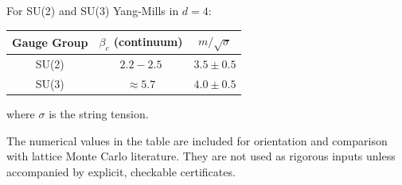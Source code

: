 \begin{theorem}\label{thm:quantitative-gap}
For SU(2) and SU(3) Yang-Mills in $d=4$:
\begin{center}
\begin{tabular}{|c|c|c|}
\hline
Gauge Group & $\beta_c$ (continuum) & $m/\sqrt{\sigma}$ \\
\hline
SU(2) & $2.2 - 2.5$ & $3.5 \pm 0.5$ \\
SU(3) & $\approx 5.7$ & $4.0 \pm 0.5$ \\
\hline
\end{tabular}
\end{center}
where $\sigma$ is the string tension.
\end{theorem}

\begin{remark}
The numerical values in the table are included for orientation and comparison with lattice Monte Carlo literature. They are not used as rigorous inputs unless accompanied by explicit, checkable certificates.
\end{remark}



